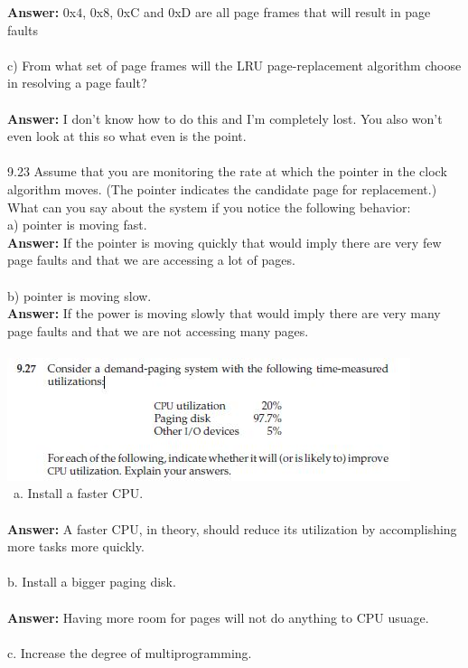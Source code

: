 \documentclass[12pt]{article}
\begin{document}
\textbf{Answer: } $0$x$4$, $0$x$8$, $0$xC and $0$xD are all page 
frames that will result in page faults
\\\\
c) From what set of page frames will the LRU page-replacement
algorithm choose in resolving a page fault?\\\\
\textbf{Answer: } I don't know how to do this and I'm completely lost.
You also won't even look at this so what even is the point.\\\\
9.23 Assume that you are monitoring the rate at which the pointer in the
clock algorithm moves. (The pointer indicates the candidate page for
replacement.) What can you say about the system if you notice the
following behavior:\\
a) pointer is moving fast.\\
\textbf{Answer: } If the pointer is moving quickly that would imply there 
are very few page faults and that we are accessing a lot of pages.
\\\\
b) pointer is moving slow.\\
\textbf{Answer: } If the power is moving slowly that would imply there are 
very many page faults and that we are not accessing many pages.
\\\\
\includegraphics[scale = 1]{q27.JPG}\\\
a. Install a faster CPU.\\\\
\textbf{Answer: } A faster CPU, in theory, should reduce its utilization by 
accomplishing more tasks more quickly.
\\\\
b. Install a bigger paging disk.\\\\
\textbf{Answer: } Having more room for pages will not do anything to CPU usuage.
\\\\
c. Increase the degree of multiprogramming.\\\\
\end{document}
